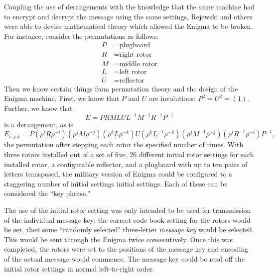 \documentclass[m3380-lec-main.tex]{subfiles}
\begin{document}
Coupling the use of derangements with the knowledge that the same machine had to encrypt and decrypt the message using the same settings, Rejewski and others were able to devise mathematical theory which allowed the Enigma to be broken. For instance, consider the permutations as follows:
\begin{align*}
P &= \text{plugboard} \\
R &= \text{right rotor} \\
M &= \text{middle rotor} \\
L &= \text{left rotor} \\
U &= \text{reflector}
\end{align*}
Then we know certain things from permutation theory and the design of the Enigma machine. First, we know that $P$ and $U$ are involutions: $P^2 = U^2 = (1)$. Further, we know that
\[ E = PRMLUL^{-1}M^{-1}R^{-1}P^{-1} \] is a derangement, as is
\[ E_{i,j,k} = P(\rho^i R\rho^{-i})(\rho^j M\rho^{-j})(\rho^k L\rho^{-k})U(\rho^k L^{-1}\rho^{-k})(\rho^j M^{-1}\rho^{-j})(\rho^i R^{-1}\rho^{-i})P^{-1},\]
the permutation after stepping each rotor the specified number of times. With three rotors installed out of a set of five, 26 different initial rotor settings for each installed rotor, a configurable reflector, and a plugboard with up to ten pairs of letters transposed, the military version of Enigma could be configured to a staggering number of initial settings
initial settings. Each of these can be considered the ``key phrase."

The use of the initial rotor setting was only intended to be used for transmission of the individual message key: the correct code book setting for the rotors would be set, then some ``randomly selected" three-letter \emph{message key} would be selected. This would be sent through the Enigma twice consecutively. Once this was completed, the rotors were set to the positions of the message key and encoding of the actual message would commence. The message key could be read off the initial rotor settings in normal left-to-right order.
\end{document}
